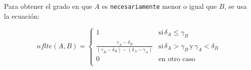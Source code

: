 \begin{definition}
Para obtener el grado en que $A$ es \texttt{necesariamente} menor o igual que $B$, se usa la ecuación:

\begin{equation}
    nflte(A,B) = \left\{ { \begin{array}{ll}
                    1 & \text{si}\, \delta_A \leq \gamma_B \\ 
                    \frac{\gamma_A - \delta_B}{(\gamma_B - \delta_B)-(\delta_A - \gamma_A)} & \text{si}\, \delta_A > \gamma_B \, \text{y} \, \gamma_A < \delta_B \\
                    0 & \text{en otro caso} \\ 
                    \end{array}  } \right.
\end{equation}
\end{definition}
